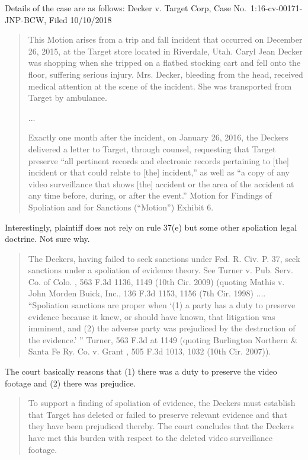 \documentclass[
  10pt,
  dvipsnames,enabledeprecatedfontcommands]{scrartcl}
\begin{document}
Details of the case are as follows: Decker v. Target Corp, Case
No.~1:16-cv-00171-JNP-BCW, Filed 10/10/2018

\begin{quote}
This Motion arises from a trip and fall incident that occurred on December 26, 2015, at the Target store
located in Riverdale, Utah. Caryl Jean Decker was shopping when she tripped on a flatbed stocking cart and
fell onto the floor, suffering serious injury. Mrs. Decker, bleeding from the head, received medical attention at the scene of the incident. She was transported from Target by ambulance.

...

Exactly one month after the incident, on January 26, 2016, the Deckers delivered a letter to Target, through
counsel, requesting that Target preserve “all pertinent records and electronic records pertaining to [the]
incident or that could relate to [the] incident,” as well as “a copy of any video surveillance that shows [the] accident or the area of the accident at any time before, during, or after the event.” Motion for Findings of Spoliation and for Sanctions (“Motion”) Exhibit 6.
\end{quote}

Interestingly, plaintiff does not rely on rule 37(e) but some other
spoliation legal doctrine. Not sure why.

\begin{quote}
The Deckers, having failed to seek sanctions under Fed. R. Civ. P. 37, seek sanctions under a spoliation of
evidence theory. See Turner v. Pub. Serv. Co. of Colo. , 563 F.3d 1136, 1149 (10th Cir. 2009) (quoting Mathis v. John Morden Buick, Inc., 136 F.3d 1153, 1156 (7th Cir. 1998) .... “Spoliation
sanctions are proper when ‘(1) a party has a duty to preserve evidence because it knew, or should have
known, that litigation was imminent, and (2) the adverse party was prejudiced by the destruction of the
evidence.’ ” Turner, 563 F.3d at 1149 (quoting Burlington Northern \& Santa Fe Ry. Co. v. Grant , 505 F.3d
1013, 1032 (10th Cir. 2007)).
\end{quote}

The court basically reasons that (1) there was a duty to preserve the
video footage and (2) there was prejudice.

\begin{quote}
To support a finding of spoliation of evidence, the Deckers must establish that Target has deleted or failed to preserve relevant evidence and that they have been prejudiced thereby. The court concludes that the
Deckers have met this burden with respect to the deleted video surveillance footage.
\end{quote}
\end{document}
